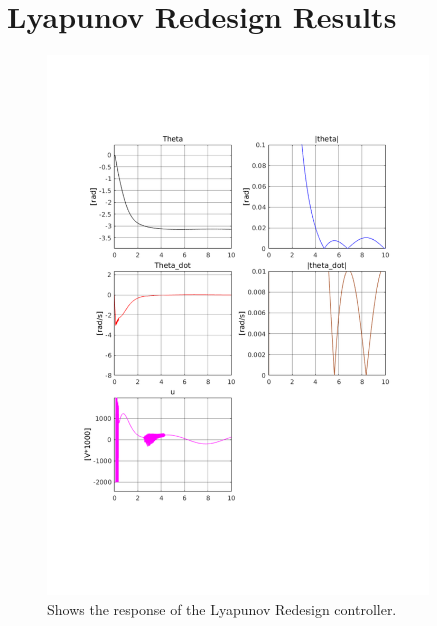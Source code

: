 \chapter{Lyapunov Redesign Results} %
\label{cha:lyapunov_redesign_results}
\begin{figure}[H]
        \centering
        \includegraphics[width=0.9\textwidth,trim=0.5cm 5cm 0.5cm 4cm, clip]{lyap.pdf}
        \caption{Shows the response of the Lyapunov Redesign controller.}
        \label{fig:lyap}
\end{figure}

